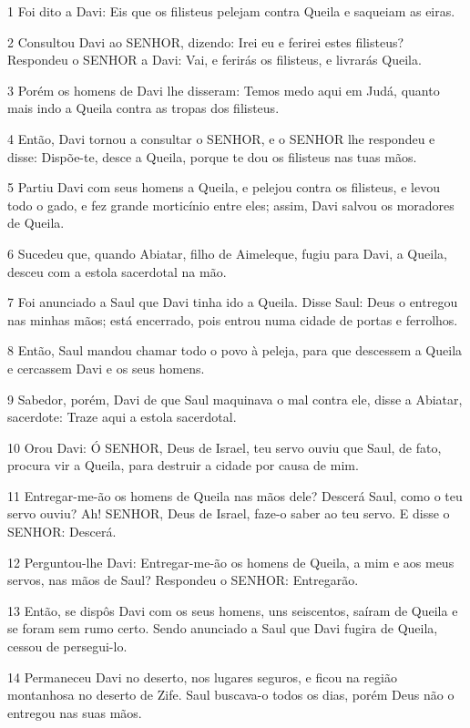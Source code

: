 \par 1 Foi dito a Davi: Eis que os filisteus pelejam contra Queila e saqueiam as eiras.
\par 2 Consultou Davi ao SENHOR, dizendo: Irei eu e ferirei estes filisteus? Respondeu o SENHOR a Davi: Vai, e ferirás os filisteus, e livrarás Queila.
\par 3 Porém os homens de Davi lhe disseram: Temos medo aqui em Judá, quanto mais indo a Queila contra as tropas dos filisteus.
\par 4 Então, Davi tornou a consultar o SENHOR, e o SENHOR lhe respondeu e disse: Dispõe-te, desce a Queila, porque te dou os filisteus nas tuas mãos.
\par 5 Partiu Davi com seus homens a Queila, e pelejou contra os filisteus, e levou todo o gado, e fez grande morticínio entre eles; assim, Davi salvou os moradores de Queila.
\par 6 Sucedeu que, quando Abiatar, filho de Aimeleque, fugiu para Davi, a Queila, desceu com a estola sacerdotal na mão.
\par 7 Foi anunciado a Saul que Davi tinha ido a Queila. Disse Saul: Deus o entregou nas minhas mãos; está encerrado, pois entrou numa cidade de portas e ferrolhos.
\par 8 Então, Saul mandou chamar todo o povo à peleja, para que descessem a Queila e cercassem Davi e os seus homens.
\par 9 Sabedor, porém, Davi de que Saul maquinava o mal contra ele, disse a Abiatar, sacerdote: Traze aqui a estola sacerdotal.
\par 10 Orou Davi: Ó SENHOR, Deus de Israel, teu servo ouviu que Saul, de fato, procura vir a Queila, para destruir a cidade por causa de mim.
\par 11 Entregar-me-ão os homens de Queila nas mãos dele? Descerá Saul, como o teu servo ouviu? Ah! SENHOR, Deus de Israel, faze-o saber ao teu servo. E disse o SENHOR: Descerá.
\par 12 Perguntou-lhe Davi: Entregar-me-ão os homens de Queila, a mim e aos meus servos, nas mãos de Saul? Respondeu o SENHOR: Entregarão.
\par 13 Então, se dispôs Davi com os seus homens, uns seiscentos, saíram de Queila e se foram sem rumo certo. Sendo anunciado a Saul que Davi fugira de Queila, cessou de persegui-lo.
\par 14 Permaneceu Davi no deserto, nos lugares seguros, e ficou na região montanhosa no deserto de Zife. Saul buscava-o todos os dias, porém Deus não o entregou nas suas mãos.
